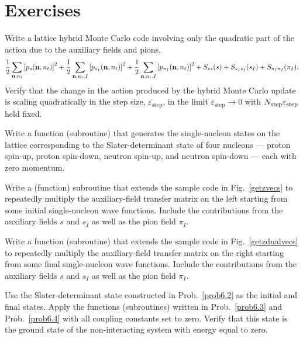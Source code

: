 \section{Exercises}

\begin{prob}
\label{prob6.1}
Write a lattice hybrid Monte Carlo code involving only the quadratic part of the action due to the auxiliary fields and pions,
\begin{equation}
\frac{1}{2}\sum_{{\bf n},n_t}\left[p_s({{\bf n},n_t})\right]^{2}+\frac{1}{2}\sum_{{\bf
n},n_t,I}\left[  p_{s_I}({{\bf n},n_t})\right]^{2}+\frac{1}{2}\sum_{{\bf
n},n_t,I}\left[p_{\pi_I}({{\bf n},n_t})\right]^{2}+S_{ss}(s) + S_{s_Is_I}(s_I)
+ S_{\pi_I\pi_I}(\pi_I).
\end{equation} 
Verify that the change in the action produced by the hybrid Monte Carlo update is scaling quadratically in the step size, $\varepsilon_{\mathrm{step}}$, in the limit $\varepsilon_{\mathrm{step}} \rightarrow 0$ with $N_{\rm step}\varepsilon_{\mathrm{step}}$ held fixed. 
\end{prob} 

\begin{prob}
\label{prob6.2}
Write a function (subroutine) that generates the single-nucleon states on the lattice corresponding to the Slater-determinant state of four nucleons --- proton spin-up, proton spin-down, neutron spin-up, and neutron spin-down --- each with zero momentum.\end{prob} 

\begin{prob}
\label{prob6.3}
Write a (function) subroutine that extends the sample code in Fig.~\ref{getzvecs}  to repeatedly multiply the auxiliary-field transfer matrix on the left starting from some initial single-nucleon wave functions.  Include the contributions from the auxiliary fields $s$ and $s_I$ as well as the pion
 field $\pi_I$.  
\end{prob}

\begin{prob}
\label{prob6.4}
Write a function (subroutine) that extends the sample code in Fig.~\ref{getzdualvecs}  to
repeatedly multiply the auxiliary-field transfer matrix on the right starting from some final
single-nucleon wave functions.  Include the contributions from the auxiliary
fields $s$ and $s_I$ as well as the pion
 field $\pi_I$.  
\end{prob}

\begin{prob}
\label{prob6.5}
Use the Slater-determinant state constructed in Prob.~\ref{prob6.2} as the initial and final states.  Apply the functions (subroutines) written in Prob.~\ref{prob6.3} and Prob.~\ref{prob6.4} with all coupling constants set to zero.  Verify that this state is the ground state of the non-interacting system with energy equal to zero.
\end{prob}

